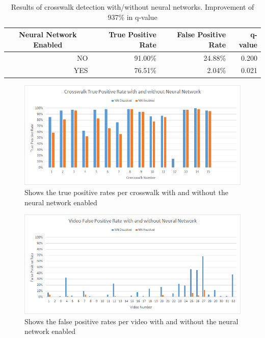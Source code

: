 \begin{table}[t]
    \begin{longtable}{|r|r|r|r|}
    \caption{Results of crosswalk detection with/without neural networks. Improvement of 937\% in q-value}
    \label{tab:overallresults}\\
    \hline
    \multicolumn{1}{|c|}{Neural Network Enabled} & True Positive Rate & False Positive Rate & q-value \bigstrut\\
    \hline
    NO    & 91.00\% & 24.88\% & 0.200 \bigstrut\\
    \hline
    YES   & 76.51\% & 2.04\% & 0.021 \bigstrut\\
    \hline
    \end{longtable}
\end{table}

\begin{figure}[t]
\begin{center}
\includegraphics[width=14cm]{figures/CrosswalkTruePosWithAndWithout.png}
\captionfonts
\caption{Shows the true positive rates per crosswalk with and without the neural network enabled}
\label{fig:CrosswalkTruePosWithAndWithout}
\end{center}
\end{figure}

\begin{figure}[t]
\begin{center}
\includegraphics[width=14cm]{figures/VideoFalsePosWithAndWithout.png}
\captionfonts
\caption{Shows the false positive rates per video with and without the neural network enabled}
\label{fig:VideoFalsePosWithAndWithout}
\end{center}
\end{figure}

